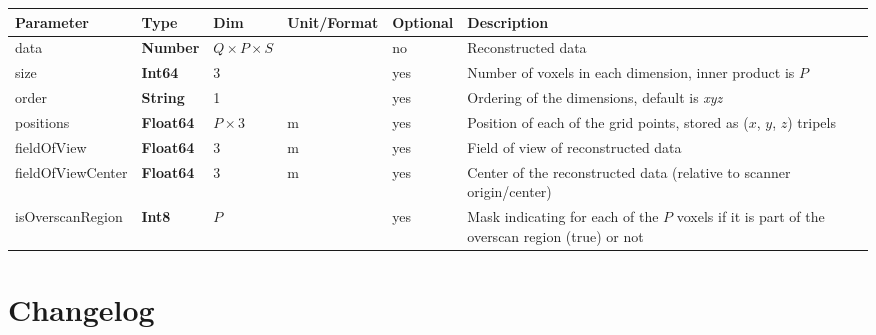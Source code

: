 \documentclass[landscape,a4paper]{article} %
\newcommand{\inltab}[1]{{\ttfamily\bfseries\color{blue}#1}}
\newcommand{\inlvar}[1]{{\ttfamily#1}}
\begin{document}
\noindent \begin{tabularx}{\columnwidth}{lllllX} 
\textbf{Parameter} & \textbf{Type} & \textbf{Dim} & \textbf{Unit/Format} & \textbf{Optional} & \textbf{Description} \\ \hline 
\inlvar{data} & \inltab{Number} & $Q\times P \times S$ & & no & Reconstructed data \\ \hline
\inlvar{size} & \inltab{Int64} & $3$ &  & yes & Number of voxels in each dimension, inner product is $P$ \\ \hline
\inlvar{order} & \inltab{String} & 1 & & yes & Ordering of the dimensions, default is \textit{xyz} \\ \hline
\inlvar{positions} & \inltab{Float64} & $P \times 3$ & m & yes & Position of each of the grid points, stored as ($x$, $y$, $z$) tripels \\ \hline
\inlvar{fieldOfView} & \inltab{Float64} & $3$ & m & yes & Field of view of reconstructed data \\ \hline
\inlvar{fieldOfViewCenter} & \inltab{Float64} & $3$ & m & yes & Center of the reconstructed data (relative to scanner origin/center) \\ \hline 
\inlvar{isOverscanRegion} & \inltab{Int8} & $P$ &  & yes & Mask indicating for each of the $P$ voxels if it is part of the overscan region (true) or not \\ \hline
\end{tabularx}


\clearpage
\section{Changelog}
\end{document}
